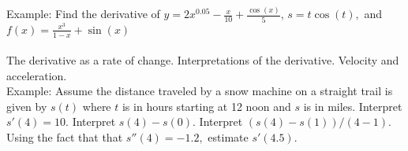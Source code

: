 \documentclass[11pt,fleqn]{article}
\begin{document}
\noindent Example: Find the derivative of $y=2x^{0.05}-\frac{x}{10}+\frac{\cos(x)}{5}$, $s=t\cos(t),$ and $f(x)=\frac{x^3}{1-x}+ \sin(x)$\\

\noindent {}\\
The derivative as a rate of change. Interpretations of the derivative. Velocity and acceleration.\\

\noindent Example: Assume the distance traveled by a snow machine on a straight trail is given by $s(t)$ where $t$ is in hours starting at 12 noon and $s$ is in miles. Interpret $s'(4)=10.$ Interpret $s(4)-s(0).$ Interpret $(s(4)-s(1))/(4-1).$ Using the fact that that $s''(4)=-1.2,$ estimate $s'(4.5).$
\end{document}
